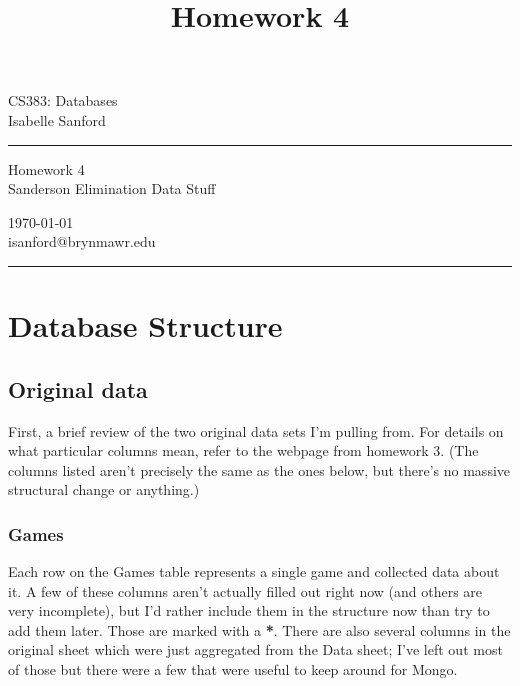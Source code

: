 \documentclass[11pt, oneside]{amsart}   	%
\begin{document}
\title{Homework 4} %
\fancyhead[C]{}
\begin{minipage}{0.295\textwidth} %
\raggedright
CS383: Databases\\ %
\footnotesize %
Isabelle Sanford %
\medskip\hrule
\end{minipage}
\begin{minipage}{0.4\textwidth} %
\centering 
\large %
Homework 4\\ %
\normalsize %
Sanderson Elimination Data Stuff \\ %
\end{minipage}
\begin{minipage}{0.295\textwidth} %
\raggedleft
\today \\
\footnotesize %
isanford@brynmawr.edu%
\medskip\hrule
\end{minipage}

\section{Database Structure}

\subsection{Original data}

First, a brief review of the two original data sets I'm pulling from. For details on what particular columns mean, refer to the webpage from homework 3. (The columns listed aren't precisely the same as the ones below, but there's no massive structural change or anything.)


\subsubsection{Games}
Each row on the Games table represents a single game and collected data about it. A few of these columns aren't actually filled out right now (and others are very incomplete), but I'd rather include them in the structure now than try to add them later. Those are marked with a \textbf{*}. There are also several columns in the original sheet which were just aggregated from the Data sheet; I've left out most of those but there were a few that were useful to keep around for Mongo. 
\end{document}
